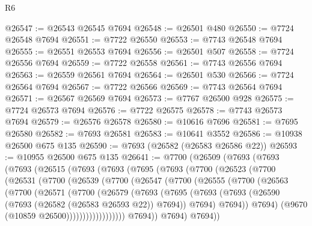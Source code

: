 \begin{lexlean}{R6}
\begin{coremodule}
@26547 := @26543 @26545 @7694
@26548 := @26501 @480
@26550 := @7724 @26548 @7694
@26551 := @7722 @26550
@26553 := @7743 @26548 @7694
@26555 := @26551 @26553 @7694
@26556 := @26501 @507
@26558 := @7724 @26556 @7694
@26559 := @7722 @26558
@26561 := @7743 @26556 @7694
@26563 := @26559 @26561 @7694
@26564 := @26501 @530
@26566 := @7724 @26564 @7694
@26567 := @7722 @26566
@26569 := @7743 @26564 @7694
@26571 := @26567 @26569 @7694
@26573 := @7767 @26500 @928
@26575 := @7724 @26573 @7694
@26576 := @7722 @26575
@26578 := @7743 @26573 @7694
@26579 := @26576 @26578
@26580 := @10616 @7696
@26581 := @7695 @26580
@26582 := @7693 @26581
@26583 := @10641 @3552
@26586 := @10938 @26500 @675 @135
@26590 := @7693 (@26582 (@26583 @26586 @22))
@26593 := @10955 @26500 @675 @135
@26641 := @7700
    (@26509
      (@7693
        (@7693
          (@7693
            (@26515
              (@7693
                (@7693
                  (@7695
                    (@7693
                      (@7700
                        (@26523
                          (@7700
                            (@26531
                              (@7700
                                (@26539
                                  (@7700
                                    (@26547
                                      (@7700
                                        (@26555
                                          (@7700
                                            (@26563
                                              (@7700
                                                (@26571
                                                  (@7700
                                                    (@26579
                                                      (@7693
                                                        (@7695
                                                          (@7693
                                                            (@7693
                                                              (@26590
                                                                (@7693
                                                                  (@26582 (@26583 @26593 @22))
                                                                  @7694))
                                                              @7694)
                                                            @7694))
                                                        @7694)
                                                      (@9670 (@10859 @26500))))))))))))))))))
                      @7694))
                  @7694)
                @7694))

\end{coremodule}
\end{lexlean}
